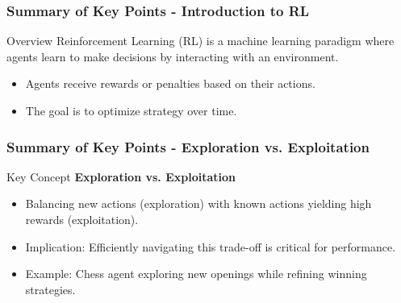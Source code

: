 \documentclass[aspectratio=169]{beamer}
\begin{document}
\begin{frame}[fragile]
    \frametitle{Summary of Key Points - Introduction to RL}
    \begin{block}{Overview}
        Reinforcement Learning (RL) is a machine learning paradigm where agents learn to make decisions by interacting with an environment. 
    \end{block}
    
    \begin{itemize}
        \item Agents receive rewards or penalties based on their actions.
        \item The goal is to optimize strategy over time.
    \end{itemize}
\end{frame}

\begin{frame}[fragile]
    \frametitle{Summary of Key Points - Exploration vs. Exploitation}
    \begin{block}{Key Concept}
        \textbf{Exploration vs. Exploitation}
    \end{block}
    \begin{itemize}
        \item Balancing new actions (exploration) with known actions yielding high rewards (exploitation).
        \item Implication: Efficiently navigating this trade-off is critical for performance.
        \item Example: Chess agent exploring new openings while refining winning strategies.
    \end{itemize}
\end{frame}
\end{document}
